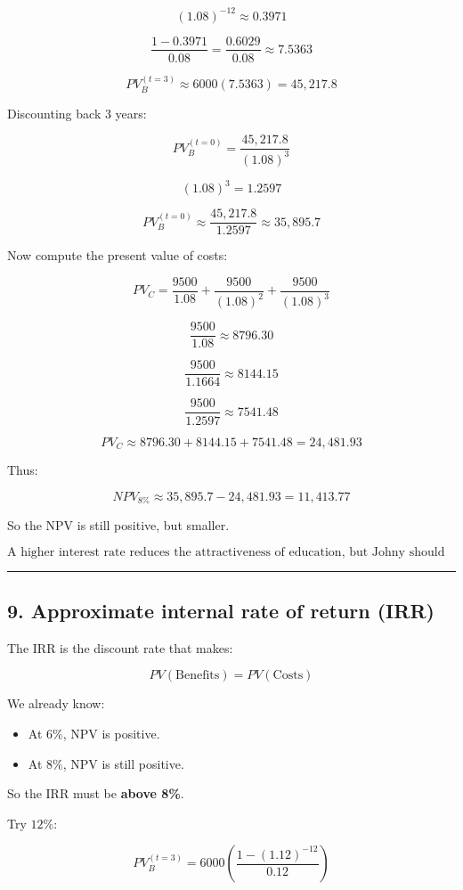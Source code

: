 \documentclass[12pt]{article}
\begin{document}
\[
(1.08)^{-12} \approx 0.3971
\]

\[
\frac{1-0.3971}{0.08} = \frac{0.6029}{0.08} \approx 7.5363
\]

\[
PV_B^{(t=3)} \approx 6000(7.5363) = 45{,}217.8
\]

Discounting back 3 years:

\[
PV_B^{(t=0)} = \frac{45{,}217.8}{(1.08)^3}
\]

\[
(1.08)^3 = 1.2597
\]

\[
PV_B^{(t=0)} \approx \frac{45{,}217.8}{1.2597} \approx 35{,}895.7
\]

Now compute the present value of costs:

\[
PV_C = \frac{9500}{1.08} + \frac{9500}{(1.08)^2} + \frac{9500}{(1.08)^3}
\]

\[
\frac{9500}{1.08} \approx 8796.30
\]

\[
\frac{9500}{1.1664} \approx 8144.15
\]

\[
\frac{9500}{1.2597} \approx 7541.48
\]

\[
PV_C \approx 8796.30 + 8144.15 + 7541.48 = 24{,}481.93
\]

Thus:

\[
NPV_{8\%} \approx 35{,}895.7 - 24{,}481.93 = 11{,}413.77
\]

So the NPV is still positive, but smaller.

\[
\boxed{\text{A higher interest rate reduces the attractiveness of education, but Johny should still invest.}}
\]

\hrule
\vspace{0.5em}

\subsection*{9. Approximate internal rate of return (IRR)}

The IRR is the discount rate that makes:

\[
PV(\text{Benefits}) = PV(\text{Costs})
\]

We already know:

\begin{itemize}
    \item At \(6\%\), NPV is positive.
    \item At \(8\%\), NPV is still positive.
\end{itemize}

So the IRR must be \textbf{above 8\%}.

Try \(12\%\):

\[
PV_B^{(t=3)} = 6000\left(\frac{1-(1.12)^{-12}}{0.12}\right)
\]
\end{document}

